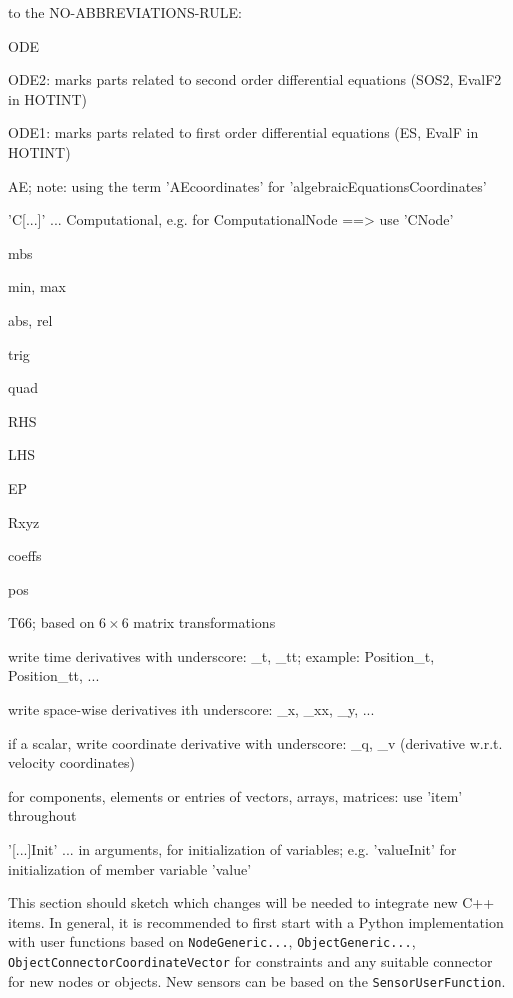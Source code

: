  to the NO-ABBREVIATIONS-RULE: %
\bi
    \item \ac{ODE}
    \item \ac{ODE2}: marks parts related to second order differential equations (SOS2, EvalF2 in HOTINT)
    \item \ac{ODE1}: marks parts related to first order differential equations (ES, EvalF in HOTINT)
    \item \ac{AE}; note: using the term 'AEcoordinates' for 'algebraicEquationsCoordinates'
    \item 'C[...]' ... Computational, e.g. for ComputationalNode ==> use 'CNode'
    \item \ac{mbs}
    \item \ac{min}, \ac{max}
    \item \ac{abs}, \ac{rel}
    \item \ac{trig} 
    \item \ac{quad}
    \item \ac{RHS}
    \item \ac{LHS}
    \item \ac{EP}
    \item \ac{Rxyz}%
    \item \ac{coeffs}
    \item \ac{pos}
    \item \ac{T66}; based on $6\times 6$ matrix transformations
    \item write time derivatives with underscore: \_t, \_tt; example: Position\_t, Position\_tt, ...
    \item write space-wise derivatives ith underscore: \_x, \_xx, \_y, ...
    \item if a scalar, write coordinate derivative with underscore: \_q, \_v (derivative w.r.t. velocity coordinates)
    \item for components, elements or entries of vectors, arrays, matrices: use 'item' throughout
    \item '[...]Init' ... in arguments, for initialization of variables; e.g. 'valueInit' for initialization of member variable 'value'
\ei


%
This section should sketch which changes will be needed to integrate new C++ items.
In general, it is recommended to first start with a Python implementation with user functions based on
\texttt{NodeGeneric...}, \texttt{ObjectGeneric...}, \texttt{ObjectConnectorCoordinateVector} for constraints and
any suitable connector for new nodes or objects. New sensors can be based on the \texttt{SensorUserFunction}.

